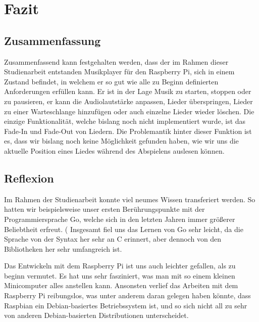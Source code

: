 
\chapter{Fazit}

\section{Zusammenfassung}
Zusammenfassend kann festgehalten werden, dass der im Rahmen dieser
Studienarbeit entstanden Musikplayer für den Raspberry Pi, sich in einem
Zustand befindet, in welchem er so gut wie alle zu Beginn definierten
Anforderungen erfüllen kann. Er ist in der Lage Musik zu starten, stoppen oder
zu pausieren, er kann die Audiolautstärke anpassen, Lieder überspringen, Lieder
zu einer Warteschlange hinzufügen oder auch einzelne Lieder wieder löschen. Die
einzige Funktionalität, welche bislang noch nicht implementiert wurde, ist das
Fade-In und Fade-Out von Liedern. Die Problemantik hinter dieser Funktion ist
es, dass wir bislang noch keine Möglichkeit gefunden haben, wie wir uns die
aktuelle Position eines Liedes während des Abspielens auslesen können. 


\section{Reflexion}
Im Rahmen der Studienarbeit konnte viel neumes Wissen transferiert werden. So
hatten wir beispielsweise unser ersten Berührungspunkte mit der
Programmiersprache Go, welche sich in den letzten Jahren immer größerer
Beliebtheit erfreut. (%
Insgesamt fiel uns das Lernen von Go sehr leicht, da die Sprache von der Syntax
her sehr an C erinnert, aber dennoch von den Bibliotheken her sehr umfangreich
ist. \newline

Das Entwickeln mit dem Raspberry Pi ist uns auch leichter gefallen, als zu
beginn vermutet. Es hat uns sehr fasziniert, was man mit so einem kleinen
Minicomputer alles anstellen kann. Ansonsten verlief das Arbeiten mit dem
Raspberry Pi reibungslos, was unter anderem daran gelegen haben könnte, dass
Raspbian ein Debian-basiertes Betriebssystem ist, und so sich nicht all zu sehr
von anderen Debian-basierten Distributionen unterscheidet.  \newline

